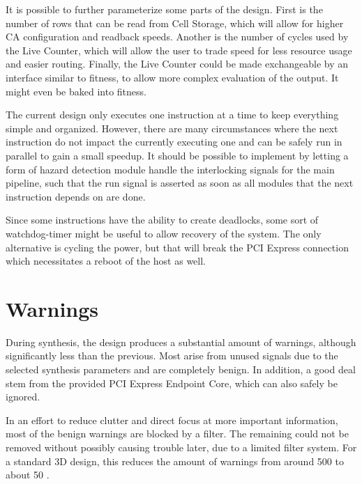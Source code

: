 It is possible to further parameterize some parts of the design.
First is the number of rows that can be read from Cell Storage, which will allow for higher CA configuration and readback speeds.
Another is the number of cycles used by the Live Counter, which will allow the user to trade speed for less resource usage and easier routing.
Finally, the Live Counter could be made exchangeable by an interface similar to fitness, to allow more complex evaluation of the output.
It might even be baked into fitness.

The current design only executes one instruction at a time to keep everything simple and organized.
However, there are many circumstances where the next instruction do not impact the currently executing one and can be safely run in parallel to gain a small speedup.
It should be possible to implement by letting a form of hazard detection module handle the interlocking signals for the main pipeline, such that the run signal is asserted as soon as all modules that the next instruction depends on are done.

Since some instructions have the ability to create deadlocks, some sort of watchdog-timer might be useful to allow recovery of the system.
The only alternative is cycling the power, but that will break the PCI Express connection which necessitates a reboot of the host as well.


\section{Warnings}

During synthesis, the design produces a substantial amount of warnings, although significantly less than the previous.
Most arise from unused signals due to the selected synthesis parameters and are completely benign.
In addition, a good deal stem from the provided PCI Express Endpoint Core, which can also safely be ignored.

In an effort to reduce clutter and direct focus at more important information, most of the benign warnings are blocked by a filter.
The remaining could not be removed without possibly causing trouble later, due to a limited filter system.
For a standard 3D design, this reduces the amount of warnings from around 500 to about 50 \footnotemark.


